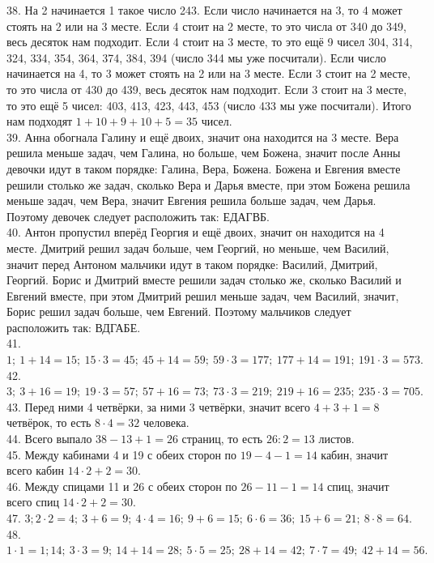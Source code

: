 \documentclass[12pt]{article}
\begin{document}
38. На 2 начинается 1 такое число 243. Если число начинается на 3, то 4 может стоять на 2 или на 3 месте. Если 4 стоит на 2 месте, то это числа от 340 до 349, весь десяток нам подходит. Если 4 стоит на 3 месте, то это ещё 9 чисел 304, 314, 324, 334, 354, 364, 374, 384, 394 (число 344 мы уже посчитали). Если число начинается на 4, то 3 может стоять на 2 или на 3 месте. Если 3 стоит на 2 месте, то это числа от 430 до 439, весь десяток нам подходит. Если 3 стоит на 3 месте, то это ещё 5 чисел: 403, 413, 423, 443, 453 (число 433 мы уже посчитали). Итого нам подходят $1+10+9+10+5=35$ чисел.\\
39. Анна обогнала Галину и ещё двоих, значит она находится на 3 месте. Вера решила меньше задач, чем Галина, но больше, чем Божена, значит после Анны девочки идут в таком порядке: Галина, Вера, Божена. Божена и Евгения вместе решили столько же задач, сколько Вера и Дарья вместе, при этом Божена решила меньше задач, чем Вера, значит Евгения решила больше задач, чем Дарья. Поэтому девочек следует расположить так: ЕДАГВБ.\\
40. Антон пропустил вперёд Георгия и ещё двоих, значит он находится на 4 месте. Дмитрий решил задач больше, чем Георгий, но меньше, чем Василий, значит перед Антоном мальчики идут в таком порядке: Василий, Дмитрий, Георгий. Борис и Дмитрий вместе решили задач столько же, сколько Василий и Евгений вместе, при этом Дмитрий решил меньше задач, чем Василий, значит, Борис решил задач больше, чем Евгений. Поэтому мальчиков следует расположить так: ВДГАБЕ.\\
41. $1;\ 1+14=15;\ 15\cdot3=45;\ 45+14=59;\ 59\cdot3=177;\ 177+14=191;\ 191\cdot3=573.$\\
42. $3;\ 3+16=19;\ 19\cdot3=57;\ 57+16=73;\ 73\cdot3=219;\ 219+16=235;\ 235\cdot3=705.$\\
43. Перед ними 4 четвёрки, за ними 3 четвёрки, значит всего $4+3+1=8$ четвёрок, то есть $8\cdot4=32$ человека.\\
44. Всего выпало $38-13+1=26$ страниц, то есть $26:2=13$ листов.\\
45. Между кабинами 4 и 19 с обеих сторон по $19-4-1=14$ кабин, значит всего кабин $14\cdot2+2=30.$\\
46. Между спицами 11 и 26 с обеих сторон по $26-11-1=14$ спиц, значит всего спиц $14\cdot2+2=30.$\\
47. $3; 2\cdot2=4;\ 3+6=9;\ 4\cdot4=16;\ 9+6=15;\ 6\cdot6=36;\ 15+6=21;\ 8\cdot8=64.$\\
48. $1\cdot1=1; 14;\ 3\cdot3=9;\ 14+14=28;\ 5\cdot5=25;\ 28+14=42;\ 7\cdot7=49;\ 42+14=56.$\\
\end{document}

